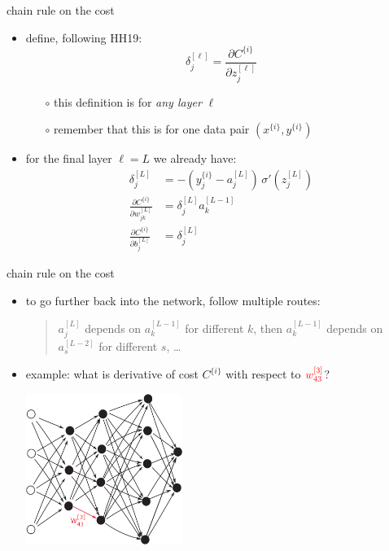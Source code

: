 \documentclass[xcolor={svgnames},
               hyperref={colorlinks,citecolor=DeepPink4,linkcolor=FireBrick,urlcolor=Maroon}]
               {beamer}
\begin{document}
\begin{frame}{chain rule on the cost}

\begin{itemize}
\item define, following HH19:
    $$\delta_j^{[\ell]} = \frac{\partial C^{\{i\}}}{\partial z_j^{[\ell]}}$$

    \begin{itemize}
    \item[$\circ$] this definition is for \emph{any layer} $\ell$
    \item[$\circ$] remember that this is for one data pair $(x^{\{i\}},y^{\{i\}})$
    \end{itemize}
\item for the final layer $\ell=L$ we already have:
\begin{align*}
\delta_j^{[L]} &= - (y_j^{\{i\}} - a_j^{[L]})\, \sigma'(z_j^{[L]}) \\
\frac{\partial C^{\{i\}}}{\partial w_{jk}^{[L]}} &= \delta_j^{[L]} a_k^{[L-1]} \\
\frac{\partial C^{\{i\}}}{\partial b_{j}^{[L]}} &= \delta_j^{[L]}
\end{align*}
\end{itemize}
\end{frame}


\begin{frame}{chain rule on the cost}

\begin{itemize}
\item to go further back into the network, follow multiple routes:
\begin{quote}
$a_j^{[L]}$ depends on $a_k^{[L-1]}$ for different $k$, then $a_k^{[L-1]}$ depends on $a_s^{[L-2]}$ for different $s$, \dots
\end{quote}
\item example: \quad what is derivative of cost $C^{\{i\}}$ with respect to \small ${\color{red} w_{43}^{[3]}}$\normalsize?

\begin{center}
\includegraphics[width=0.4\textwidth]{figs/bigredw}
\end{center}
\end{itemize}
\end{frame}
\end{document}
